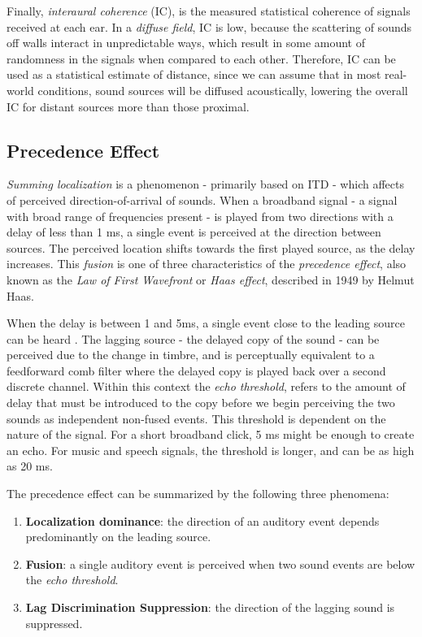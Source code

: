 Finally, \textit{interaural coherence} (IC), is the measured statistical coherence of signals received at each ear. In a \textit{diffuse field}, IC is low, because the scattering of sounds off walls interact in unpredictable ways, which result in some amount of randomness in the signals when compared to each other. Therefore, IC can be used as a statistical estimate of distance, since we can assume that in most real-world conditions, sound sources will be diffused acoustically, lowering the overall IC for distant sources more than those proximal.

\subsection{Precedence Effect}

\textit{Summing localization} is a phenomenon - primarily based on ITD - which affects of perceived direction-of-arrival of sounds. When a broadband signal - a signal with broad range of frequencies present - is played from two directions with a delay of less than 1 ms, a single event is perceived at the direction between sources. The perceived location shifts towards the first played source, as the delay increases. This \textit{fusion} is one of three characteristics of the \textit{precedence effect}, also known as the \textit{Law of First Wavefront} or \textit{Haas effect}, described in 1949 by Helmut Haas. 

When the delay is between 1 and 5ms, a single event close to the leading source can be heard \cite{hacihabiboglu2017perceptual}. The lagging source - the delayed copy of the sound - can be perceived due to the change in timbre, and is perceptually equivalent to a feedforward comb filter where the delayed copy is played back over a second discrete channel. Within this context the \textit{echo threshold}, refers to the amount of delay that must be introduced to the copy before we begin perceiving the two sounds as independent non-fused events. This threshold is dependent on the nature of the signal. For a short broadband click, 5 ms might be enough to create an echo. For music and speech signals, the threshold is longer, and can be as high as 20 ms.

The precedence effect can be summarized by the following three phenomena: 


\begin{enumerate}
    \item \textbf{Localization dominance}: the direction of an auditory event depends predominantly on the leading source.
    \item \textbf{Fusion}: a single auditory event is perceived when two sound events are below the \textit{echo threshold}.
    \item \textbf{Lag Discrimination Suppression}: the direction of the lagging sound is suppressed.  
\end{enumerate}

